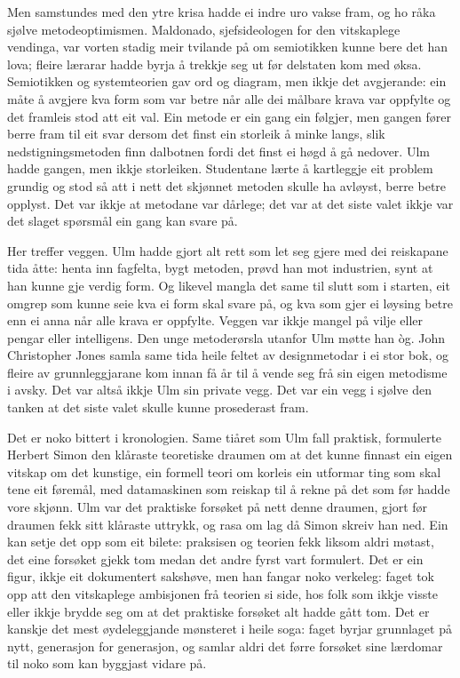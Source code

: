 Men samstundes med den ytre krisa hadde ei indre uro vakse fram, og ho råka sjølve metodeoptimismen. Maldonado, sjefsideologen for den vitskaplege vendinga, var vorten stadig meir tvilande på om semiotikken kunne bere det han lova; fleire lærarar hadde byrja å trekkje seg ut før delstaten kom med øksa. Semiotikken og systemteorien gav ord og diagram, men ikkje det avgjerande: ein måte å avgjere kva form som var betre når alle dei målbare krava var oppfylte og det framleis stod att eit val. Ein metode er ein gang ein følgjer, men gangen fører berre fram til eit svar dersom det finst ein storleik å minke langs, slik nedstigningsmetoden finn dalbotnen fordi det finst ei høgd å gå nedover. Ulm hadde gangen, men ikkje storleiken. Studentane lærte å kartleggje eit problem grundig og stod så att i nett det skjønnet metoden skulle ha avløyst, berre betre opplyst. Det var ikkje at metodane var dårlege; det var at det siste valet ikkje var det slaget spørsmål ein gang kan svare på.

Her treffer veggen. Ulm hadde gjort alt rett som let seg gjere med dei reiskapane tida åtte: henta inn fagfelta, bygt metoden, prøvd han mot industrien, synt at han kunne gje verdig form. Og likevel mangla det same til slutt som i starten, eit omgrep som kunne seie kva ei form skal svare på, og kva som gjer ei løysing betre enn ei anna når alle krava er oppfylte. Veggen var ikkje mangel på vilje eller pengar eller intelligens. Den unge metoderørsla utanfor Ulm møtte han òg. John Christopher Jones samla same tida heile feltet av designmetodar i ei stor bok, og fleire av grunnleggjarane kom innan få år til å vende seg frå sin eigen metodisme i avsky\autocite{jones1970methods}. Det var altså ikkje Ulm sin private vegg. Det var ein vegg i sjølve den tanken at det siste valet skulle kunne prosederast fram.

Det er noko bittert i kronologien. Same tiåret som Ulm fall praktisk, formulerte Herbert Simon den klåraste teoretiske draumen om at det kunne finnast ein eigen vitskap om det kunstige, ein formell teori om korleis ein utformar ting som skal tene eit føremål, med datamaskinen som reiskap til å rekne på det som før hadde vore skjønn\autocite{simon1969sciences}. Ulm var det praktiske forsøket på nett denne draumen, gjort før draumen fekk sitt klåraste uttrykk, og rasa om lag då Simon skreiv han ned. Ein kan setje det opp som eit bilete: praksisen og teorien fekk liksom aldri møtast, det eine forsøket gjekk tom medan det andre fyrst vart formulert. Det er ein figur, ikkje eit dokumentert sakshøve, men han fangar noko verkeleg: faget tok opp att den vitskaplege ambisjonen frå teorien si side, hos folk som ikkje visste eller ikkje brydde seg om at det praktiske forsøket alt hadde gått tom. Det er kanskje det mest øydeleggjande mønsteret i heile soga: faget byrjar grunnlaget på nytt, generasjon for generasjon, og samlar aldri det førre forsøket sine lærdomar til noko som kan byggjast vidare på.

